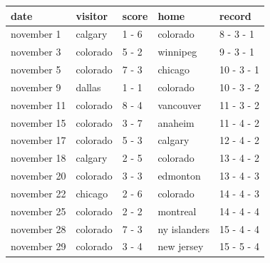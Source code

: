 \documentclass{article}
\begin{document}
\begin{tabular}{lllll}
\toprule
date & visitor & score & home & record \\
\midrule
november 1 & calgary & 1 - 6 & colorado & 8 - 3 - 1 \\
november 3 & colorado & 5 - 2 & winnipeg & 9 - 3 - 1 \\
november 5 & colorado & 7 - 3 & chicago & 10 - 3 - 1 \\
november 9 & dallas & 1 - 1 & colorado & 10 - 3 - 2 \\
november 11 & colorado & 8 - 4 & vancouver & 11 - 3 - 2 \\
november 15 & colorado & 3 - 7 & anaheim & 11 - 4 - 2 \\
november 17 & colorado & 5 - 3 & calgary & 12 - 4 - 2 \\
november 18 & calgary & 2 - 5 & colorado & 13 - 4 - 2 \\
november 20 & colorado & 3 - 3 & edmonton & 13 - 4 - 3 \\
november 22 & chicago & 2 - 6 & colorado & 14 - 4 - 3 \\
november 25 & colorado & 2 - 2 & montreal & 14 - 4 - 4 \\
november 28 & colorado & 7 - 3 & ny islanders & 15 - 4 - 4 \\
november 29 & colorado & 3 - 4 & new jersey & 15 - 5 - 4 \\
\bottomrule
\end{tabular}
\end{document}
